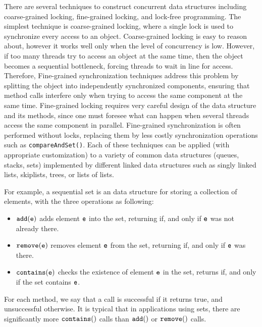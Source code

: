 There are several techniques to construct concurrent data structures including coarse-grained locking, fine-grained locking, and lock-free programming. The simplest technique is coarse-grained locking, where a single lock is used to synchronize every access to an object. Coarse-grained locking is easy to reason about, however it works well only when the level of concurrency is low. However, if too many threads try to access an object at the same time, then the object becomes a sequential bottleneck, forcing threads to wait in line for access. Therefore, Fine-grained synchronization techniques address this problem by splitting the object into independently synchronized components, ensuring that method calls interfere only when trying to access the same component at the same time. Fine-grained locking requires very careful design of the data structure and its
methods, since one must foresee what can happen when several threads access
the same component in parallel.
Fine-grained synchronization is often performed without locks, replacing them by less costly
synchronization operations such as {\tt compareAndSet()}. Each of these techniques can be applied (with appropriate customization) to a variety of common data structures (queues, stacks, sets) implemented by different linked data structures such as singly linked lists, skiplists, trees, or lists of lists. 

For example,  a sequential set is an data structure for storing a collection of elements, with the three operations as following: 
\begin{itemize}
\item $\tt add(e)$ adds element $\tt e$ into the set, returning \true\; if, and only if $\tt e$ was not
already there. 
\item $\tt remove(e)$ removes element $\tt e$ from the set, returning \true\; if, and only if
$\tt e$ was there. 
\item $\tt contains(e)$ checks the existence of element $\tt e$ in the set, returns \true\; if, and only if the set contains $\tt e$. 
\end{itemize}
For each method, we say that a call is successful if it returns true, and unsuccessful
otherwise. It is typical that in applications using sets, there are significantly more
$\tt contains()$ calls than $\tt add()$ or $\tt remove()$ calls.

